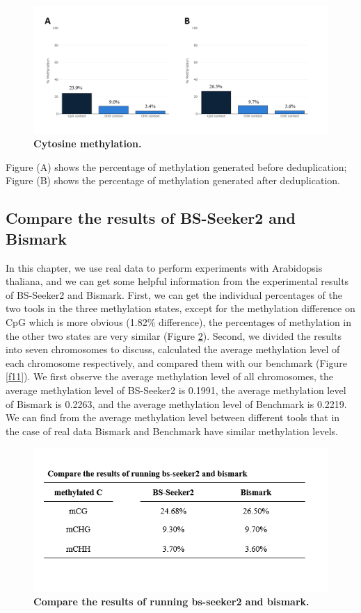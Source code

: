 \documentclass{PHlab-thesis}
\begin{document}
\begin{figure}[h]
  \centering
  \includegraphics[scale=0.8]{figures/cytosine_methylation.png}
  \caption{\textbf{Cytosine methylation.}
  }
  \label{f9}
\end{figure}

Figure (A) shows the percentage of methylation generated before deduplication; Figure (B) shows the percentage of methylation generated after deduplication.

\subsection{Compare the results of BS-Seeker2 and Bismark}
In this chapter, we use real data to perform experiments with Arabidopsis thaliana, and we can get some helpful information from the experimental results of BS-Seeker2 and Bismark. First, we can get the individual percentages of the two tools in the three methylation states, except for the methylation difference on CpG which is more obvious (1.82\% difference), the percentages of methylation in the other two states are very similar (Figure \ref{f10}). Second, we divided the results into seven chromosomes to discuss, calculated the average methylation level of each chromosome respectively, and compared them with our benchmark (Figure \ref{f11}). We first observe the average methylation level of all chromosomes, the average methylation level of BS-Seeker2 is 0.1991, the average methylation level of Bismark is 0.2263, and the average methylation level of Benchmark is 0.2219. We can find from the average methylation level between different tools that in the case of real data Bismark and Benchmark have similar methylation levels.

\begin{figure}[h]
  \centering
  \includegraphics[scale=0.8]{table/table3.png}
  \caption{\textbf{Compare the results of running bs-seeker2 and bismark.}
  }
  \label{f10}
\end{figure}
\end{document}

